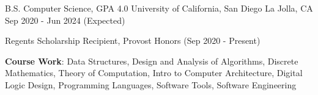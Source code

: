 

\begin{cventries}

  \cventry
    {B.S. Computer Science,  GPA 4.0} %
    {University of California, San Diego} %
    {La Jolla, CA} %
    {Sep 2020 - Jun 2024 (Expected)} %
    { \begin{cvitems}
        \item {Regents Scholarship Recipient, Provost Honors (Sep 2020 - Present)} 
        \item {\textbf{Course Work}: Data Structures, Design and Analysis of Algorithms, Discrete Mathematics, Theory of Computation, Intro to Computer Architecture, Digital Logic Design, Programming Languages, Software Tools, Software Engineering}
    \end{cvitems}
    } 
    
   
    
   

    
    

\end{cventries}
